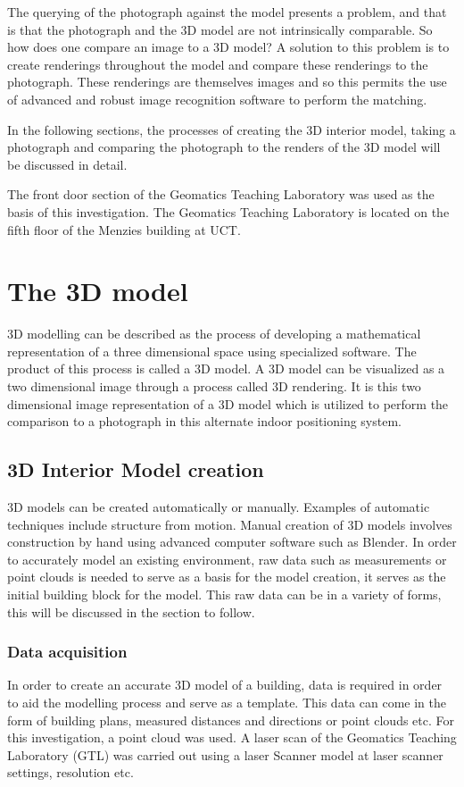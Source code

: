 \documentclass[11pt,a4paper]{report}
\begin{document}
	The querying of the photograph against the model presents a problem, and that is that the photograph and the 3D model are not intrinsically comparable. So how does one compare an image to a 3D model? A solution to this problem is to create renderings throughout the model and compare these renderings to the photograph. These renderings are themselves images and so this permits the use of advanced and robust image recognition software to perform the matching.
	
	In the following sections, the processes of creating the 3D interior model, taking a photograph and comparing the photograph to the renders of the 3D model will be discussed in detail.
	
	The front door section of the Geomatics Teaching Laboratory was used as the basis of this investigation. The Geomatics Teaching Laboratory is located on the fifth floor of the Menzies building at UCT.
		
	\section{The 3D model}
		3D modelling can be described as the process of developing a mathematical representation of a three dimensional space using specialized software. The product of this process is called a 3D model. A 3D model can be visualized as a two dimensional image through a process called 3D rendering. It is this two dimensional image representation of a 3D model which is utilized to perform the comparison to a photograph in this alternate indoor positioning system.
		
		\subsection{3D Interior Model creation}
			3D models can be created automatically or manually. Examples of automatic techniques include structure from motion. Manual creation of 3D models involves construction by hand using advanced computer software such as Blender. In order to accurately model an existing environment, raw data such as measurements or point clouds is needed to serve as a basis for the model creation, it serves as the initial building block for the model. This raw data can be in a variety of forms, this will be discussed in the section to follow.
		
			\subsubsection{Data acquisition}
				In order to create an accurate 3D model of a building, data is required in order to aid the modelling process and serve as a template. This data can come in the form of building plans, measured distances and directions or point clouds etc.
				For this investigation, a point cloud was used. A laser scan of the Geomatics Teaching Laboratory (GTL) was carried out using a {{laser Scanner model}} at {{laser scanner settings, resolution etc}}. 
				
\end{document}
